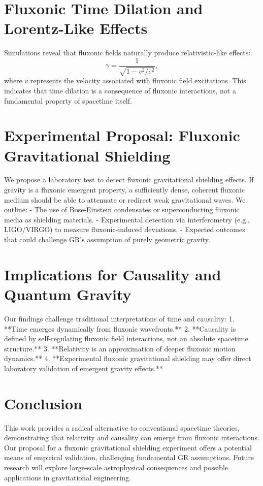\documentclass{article}
\begin{document}
\section{Fluxonic Time Dilation and Lorentz-Like Effects}
Simulations reveal that fluxonic fields naturally produce relativistic-like effects:
\begin{equation}
    \gamma = \frac{1}{\sqrt{1 - v^2/c^2}},
\end{equation}
where $v$ represents the velocity associated with fluxonic field excitations. This indicates that time dilation is a consequence of fluxonic interactions, not a fundamental property of spacetime itself.

\section{Experimental Proposal: Fluxonic Gravitational Shielding}
We propose a laboratory test to detect fluxonic gravitational shielding effects. If gravity is a fluxonic emergent property, a sufficiently dense, coherent fluxonic medium should be able to attenuate or redirect weak gravitational waves. We outline:
- The use of Bose-Einstein condensates or superconducting fluxonic media as shielding materials.
- Experimental detection via interferometry (e.g., LIGO/VIRGO) to measure fluxonic-induced deviations.
- Expected outcomes that could challenge GR’s assumption of purely geometric gravity.

\section{Implications for Causality and Quantum Gravity}
Our findings challenge traditional interpretations of time and causality:
1. **Time emerges dynamically from fluxonic wavefronts.**
2. **Causality is defined by self-regulating fluxonic field interactions, not an absolute spacetime structure.**
3. **Relativity is an approximation of deeper fluxonic motion dynamics.**
4. **Experimental fluxonic gravitational shielding may offer direct laboratory validation of emergent gravity effects.**

\section{Conclusion}
This work provides a radical alternative to conventional spacetime theories, demonstrating that relativity and causality can emerge from fluxonic interactions. Our proposal for a fluxonic gravitational shielding experiment offers a potential means of empirical validation, challenging fundamental GR assumptions. Future research will explore large-scale astrophysical consequences and possible applications in gravitational engineering.
\end{document}
